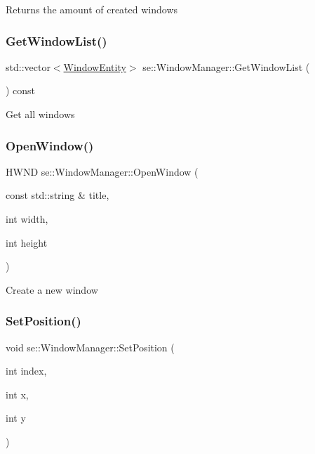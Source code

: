 Returns the amount of created windows \mbox{\label{classse_1_1_window_manager_a95b009b78fcf4293f9e6bb88985f7803}} 
\subsubsection{\texorpdfstring{Get\+Window\+List()}{GetWindowList()}}
{\footnotesize\ttfamily std\+::vector$<$\mbox{\hyperlink{structse_1_1_window_entity}{Window\+Entity}}$>$ se\+::\+Window\+Manager\+::\+Get\+Window\+List (\begin{DoxyParamCaption}{ }\end{DoxyParamCaption}) const}

Get all windows \mbox{\label{classse_1_1_window_manager_abeae1c064ff6f5b166b10539addd5a53}} 
\subsubsection{\texorpdfstring{Open\+Window()}{OpenWindow()}}
{\footnotesize\ttfamily H\+W\+ND se\+::\+Window\+Manager\+::\+Open\+Window (\begin{DoxyParamCaption}\item[{const std\+::string \&}]{title,  }\item[{int}]{width,  }\item[{int}]{height }\end{DoxyParamCaption})}

Create a new window \mbox{\label{classse_1_1_window_manager_a9cd532f3d16f008eef0d9bec36d521c0}} 
\subsubsection{\texorpdfstring{Set\+Position()}{SetPosition()}}
{\footnotesize\ttfamily void se\+::\+Window\+Manager\+::\+Set\+Position (\begin{DoxyParamCaption}\item[{int}]{index,  }\item[{int}]{x,  }\item[{int}]{y }\end{DoxyParamCaption})}

